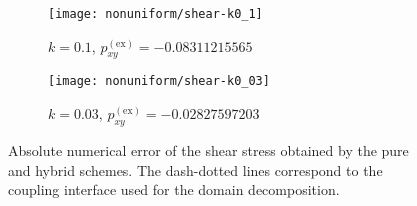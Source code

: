 \documentclass{elsarticle} %
\begin{document}
\begin{comment} %
\begin{figure}
   \centering
   \begin{subfigure}[b]{0.5\textwidth}
       \texttt{[image: d3q19-k0\_3]}
       \caption{ (D3Q19)}
       \label{fig:d3q19-k03}
   \end{subfigure}%
   \begin{subfigure}[b]{0.5\textwidth}
       \texttt{[image: d3v96-k0\_3.pdf]}
       \caption{ (D3Q96)}
       \label{fig:d3v96-k03}
   \end{subfigure}\\
   \begin{subfigure}[b]{0.5\textwidth}
       \includegraphics[width=\textwidth]
       {hyb-d3q19-k0_3.pdf}
       \caption{hybrid (DV and D3Q19)}
       \label{fig:hyb:d3q19-k03}
   \end{subfigure}%
   \begin{subfigure}[b]{0.5\textwidth}
       \includegraphics[width=\textwidth]
       {hyb-d3v96-k0_3.pdf}
       \caption{hybrid (DV and D3Q96)}
       \label{fig:hyb:d3v96-k03}
   \end{subfigure}
   \caption{
       Numerical solution of the Couette-flow problem for $k=0.3$ obtained by the proposed hybrid method.
       The matching point is placed  at the  distance $1.2 Kn$ from the  boundary.
       The black lines are the high-accuracy solution for the BGK model.
       The black boxes correspond to the tabulated solutions~\cite{Luo2016}.
   }\label{fig:hybrid03}
\end{figure}
\end{comment}

\begin{figure}
    \centering
    \begin{subfigure}[b]{0.5\textwidth}
        \texttt{[image: nonuniform/shear-k0\_1]}
        \caption{\(k=0.1\), \(p^\mathrm{(ex)}_{xy} = -0.08311215565\)~\cite{Luo2016}}
        \label{fig:accuracy-k01}
    \end{subfigure}%
    \begin{subfigure}[b]{0.5\textwidth}
        \texttt{[image: nonuniform/shear-k0\_03]}
        \caption{\(k=0.03\), \(p^\mathrm{(ex)}_{xy} = -0.02827597203\)~\cite{Luo2016}}
        \label{fig:accuracy-k003}
    \end{subfigure}
    \caption{
        Absolute numerical error of the shear stress obtained by the pure and hybrid schemes.
        The dash-dotted lines correspond to the coupling interface used for the domain decomposition.
    }\label{fig:accuracy}
\end{figure}
\end{document}

